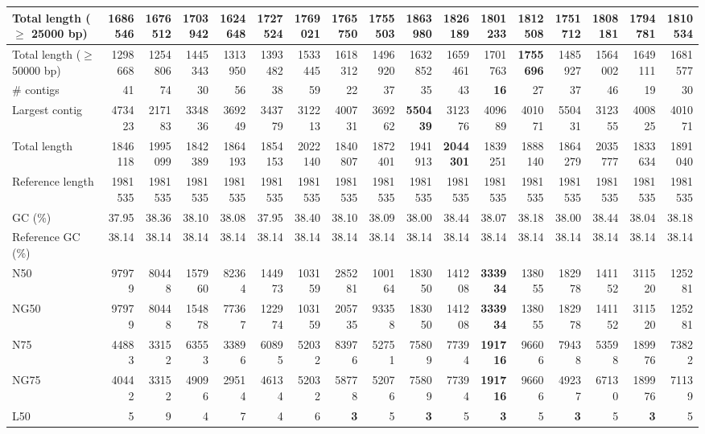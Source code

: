 \documentclass[12pt,a4paper]{article}
\begin{document}
\begin{table}[ht]
\begin{center}
\begin{tabular}{|l*{16}{|r}|}
Total length ($\geq$ 25000 bp) & 1686546 & 1676512 & 1703942 & 1624648 & 1727524 & 1769021 & 1765750 & 1755503 & {\bf 1863980} & 1826189 & 1801233 & 1812508 & 1751712 & 1808181 & 1794781 & 1810534 \\ \hline
Total length ($\geq$ 50000 bp) & 1298668 & 1254806 & 1445343 & 1313950 & 1393482 & 1533445 & 1618312 & 1496920 & 1632852 & 1659461 & 1701763 & {\bf 1755696} & 1485927 & 1564002 & 1649111 & 1681577 \\ \hline
\# contigs & 41 & 74 & 30 & 56 & 38 & 59 & 22 & 37 & 35 & 43 & {\bf 16} & 27 & 37 & 46 & 19 & 30 \\ \hline
Largest contig & 473423 & 217183 & 334836 & 369249 & 343779 & 312213 & 400731 & 369262 & {\bf 550439} & 312376 & 409689 & 401071 & 550431 & 312355 & 400825 & 401071 \\ \hline
Total length & 1846118 & 1995099 & 1842389 & 1864193 & 1854153 & 2022140 & 1840807 & 1872401 & 1941913 & {\bf 2044301} & 1839251 & 1888140 & 1864279 & 2035777 & 1833634 & 1891040 \\ \hline
Reference length & 1981535 & 1981535 & 1981535 & 1981535 & 1981535 & 1981535 & 1981535 & 1981535 & 1981535 & 1981535 & 1981535 & 1981535 & 1981535 & 1981535 & 1981535 & 1981535 \\ \hline
GC (\%) & 37.95 & 38.36 & 38.10 & 38.08 & 37.95 & 38.40 & 38.10 & 38.09 & 38.00 & 38.44 & 38.07 & 38.18 & 38.00 & 38.44 & 38.04 & 38.18 \\ \hline
Reference GC (\%) & 38.14 & 38.14 & 38.14 & 38.14 & 38.14 & 38.14 & 38.14 & 38.14 & 38.14 & 38.14 & 38.14 & 38.14 & 38.14 & 38.14 & 38.14 & 38.14 \\ \hline
N50 & 97979 & 80448 & 157960 & 82364 & 144973 & 103159 & 285281 & 100164 & 183050 & 141208 & {\bf 333934} & 138055 & 182978 & 141152 & 311520 & 125281 \\ \hline
NG50 & 97979 & 80448 & 154878 & 77367 & 122974 & 103159 & 205735 & 93358 & 183050 & 141208 & {\bf 333934} & 138055 & 182978 & 141152 & 311520 & 125281 \\ \hline
N75 & 44883 & 33152 & 63553 & 33896 & 60895 & 52032 & 83976 & 52751 & 75809 & 77394 & {\bf 191716} & 96606 & 79438 & 53598 & 189976 & 73822 \\ \hline
NG75 & 40442 & 33152 & 49096 & 29514 & 46134 & 52032 & 58778 & 52076 & 75809 & 77394 & {\bf 191716} & 96606 & 49237 & 67130 & 189976 & 71139 \\ \hline
L50 & 5 & 9 & 4 & 7 & 4 & 6 & {\bf 3} & 5 & {\bf 3} & 5 & {\bf 3} & 5 & {\bf 3} & 5 & {\bf 3} & 5 \\ \hline

\end{tabular}
\end{center}
\end{table}
\end{document}

